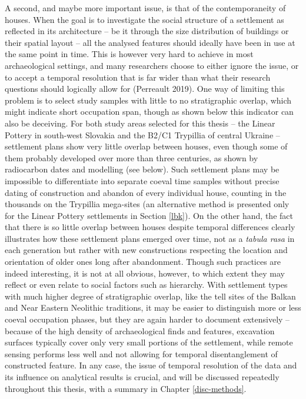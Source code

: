 \documentclass[
  12pt,
  a4paper, twoside]{book}
\begin{document}
A second, and maybe more important issue, is that of the contemporaneity of houses. When the goal is to investigate the social structure of a settlement as reflected in its architecture -- be it through the size distribution of buildings or their spatial layout -- all the analysed features should ideally have been in use at the same point in time. This is however very hard to achieve in most archaeological settings, and many researchers choose to either ignore the issue, or to accept a temporal resolution that is far wider than what their research questions should logically allow for (Perreault 2019). One way of limiting this problem is to select study samples with little to no stratigraphic overlap, which might indicate short occupation span, though as shown below this indicator can also be deceiving. For both study areas selected for this thesis -- the Linear Pottery in south-west Slovakia and the B2/C1 Trypillia of central Ukraine -- settlement plans show very little overlap between houses, even though some of them probably developed over more than three centuries, as shown by radiocarbon dates and modelling (see below). Such settlement plans may be impossible to differentiate into separate coeval time samples without precise dating of construction and abandon of every individual house, counting in the thousands on the Trypillia mega-sites (an alternative method is presented only for the Linear Pottery settlements in Section \ref{lbk}). On the other hand, the fact that there is so little overlap between houses despite temporal differences clearly illustrates how these settlement plans emerged over time, not as a \emph{tabula rasa} in each generation but rather with new constructions respecting the location and orientation of older ones long after abandonment. Though such practices are indeed interesting, it is not at all obvious, however, to which extent they may reflect or even relate to social factors such as hierarchy. With settlement types with much higher degree of stratigraphic overlap, like the tell sites of the Balkan and Near Eastern Neolithic traditions, it may be easier to distinguish more or less coeval occupation phases, but they are again harder to document extensively -- because of the high density of archaeological finds and features, excavation surfaces typically cover only very small portions of the settlement, while remote sensing performs less well and not allowing for temporal disentanglement of constructed feature. In any case, the issue of temporal resolution of the data and its influence on analytical results is crucial, and will be discussed repeatedly throughout this thesis, with a summary in Chapter \ref{disc-methods}.
\end{document}
